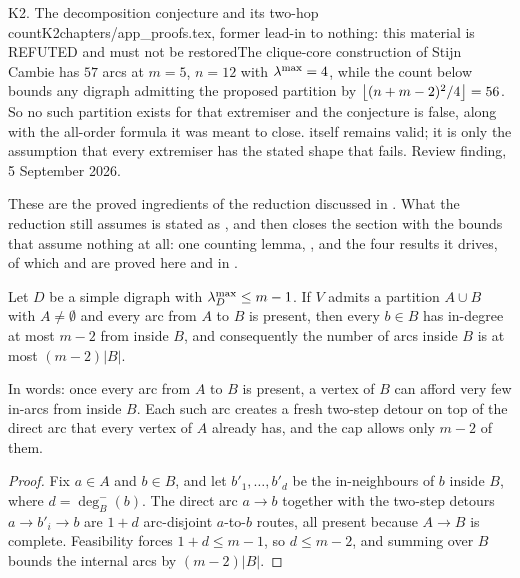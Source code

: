 \begin{offcut}{K2. The decomposition conjecture and its two-hop count}{K2}{chapters/app\_proofs.tex, former lead-in to }{nothing: this material is REFUTED and must not be restored}{The clique-core construction of Stijn Cambie has $57$ arcs at $m=5$, $n=12$ with $\lambda^{\max}=4$, while the count below bounds any digraph admitting the proposed partition by $\left\lfloor (n+m-2)^2/4 \right\rfloor=56$. So no such partition exists for that extremiser and the conjecture is false, along with the all-order formula it was meant to close.  itself remains valid; it is only the assumption that every extremiser has the stated shape that fails. Review finding, 5 September 2026.}

These are the proved ingredients of the reduction discussed in . What the reduction still assumes is stated as , and  then closes the section with the bounds that assume nothing at all: one counting lemma, , and the four results it drives, of which  and  are proved here and  in .

\begin{proposition}\label{prop:two-hop-bipartite}
Let $D$ be a simple digraph with $\lambda^{\max}_D \le m-1$. If $V$ admits a partition $A \cup B$ with $A \ne \emptyset$ and every arc from $A$ to $B$ is present, then every $b \in B$ has in-degree at most $m - 2$ from inside $B$, and consequently the number of arcs inside $B$ is at most $(m-2)|B|$.
\end{proposition}

In words: once every arc from $A$ to $B$ is present, a vertex of $B$ can afford very few in-arcs from inside $B$. Each such arc creates a fresh two-step detour on top of the direct arc that every vertex of $A$ already has, and the cap allows only $m-2$ of them.

\begin{proof}
Fix $a \in A$ and $b \in B$, and let $b'_1, \dots, b'_d$ be the in-neighbours of $b$ inside $B$, where $d = \deg^-_B(b)$. The direct arc $a \to b$ together with the two-step detours $a \to b'_i \to b$ are $1 + d$ arc-disjoint $a$-to-$b$ routes, all present because $A \to B$ is complete. Feasibility forces $1 + d \le m - 1$, so $d \le m - 2$, and summing over $B$ bounds the internal arcs by $(m-2)|B|$.
\end{proof}


\end{offcut}
